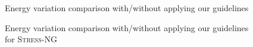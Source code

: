 \begin{figure}%
    \caption{Energy variation comparison with/without applying our guidelines}\label{fig:optimized}
\end{figure}

\begin{figure}%
    \caption{Energy variation comparison with/without applying our guidelines for \textsc{Stress-NG}}\label{fig:stress}
\end{figure}

